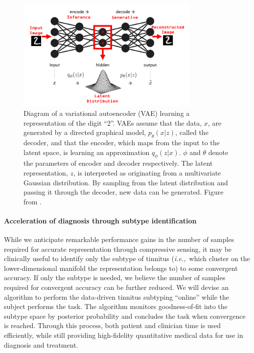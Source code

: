 \documentclass[11pt, notitlepage]{article} %
\def\ie{{\emph{i.e.,}}~}
\begin{document}
\begin{figure}[h] %
	\centering
	\includegraphics[width=0.8\textwidth]{Figures/variational-autoencoder.png}
	\caption{Diagram of a variational autoencoder (VAE) learning a representation of the digit ``2''.
	VAEs assume that the data, $x$, are generated by a directed graphical model, $p_\theta(x|z)$,
	called the decoder,
	and that the encoder, which maps from the input to the latent space, is learning an approximation $q_\phi(z|x)$. $\phi$ and $\theta$
	denote the parameters of encoder and decoder respectively.
	The latent representation, $z$, is interpreted as originating from a multivariate Gaussian distribution.
	By sampling from the latent distribution and passing it through the decoder, new data can be generated. Figure from \cite{IntroductionAutoencoders2020}.}
	\label{fig:vae}
\end{figure}

\paragraph{Acceleration of diagnosis through subtype identification}

While we anticipate remarkable performance gains in the number of samples required for accurate representation
through compressive sensing,
it may be clinically useful to identify only the subtype of tinnitus
(\ie which cluster on the lower-dimensional manifold the representation belongs to)
to some convergent accuracy.
If only the subtype is needed,
we believe the number of samples required for convergent accuracy can be further reduced.
We will devise an algorithm to perform the data-driven tinnitus subtyping ``online''
while the subject performs the task.
The algorithm monitors goodness-of-fit into the subtype space by posterior probability
and concludes the task when convergence is reached.
Through this process, both patient and clinician time is used efficiently, while still providing high-fidelity quantitative medical data
for use in diagnosis and treatment.
\end{document}
